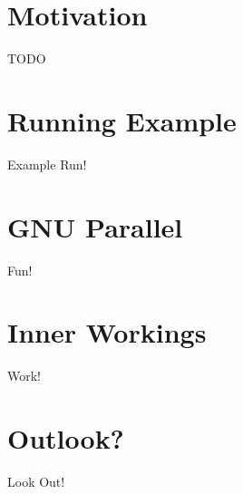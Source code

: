 


\section{Motivation}
\begin{frame}{TODO}
\end{frame}
\section{Running Example}
\begin{frame}{Example Run!}

\end{frame}
\section{\texorpdfstring{GNU}{\textsc{gnu}} Parallel}
\begin{frame}{Fun!}

\end{frame}

\section{Inner Workings}
\begin{frame}{Work!}

\end{frame}

\section{Outlook?}
\begin{frame}{Look Out!}

\end{frame}

